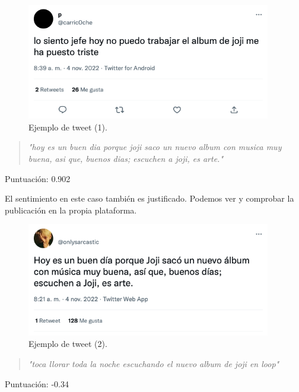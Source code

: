 \begin{figure}[H]
    \centering
    \myfloatalign
    \includegraphics[width=0.95\textwidth]{gfx/twit1.png}
    \caption[Ejemplo de tweet (1)]{Ejemplo de tweet (1).}\label{gfx:twit1}
\end{figure}

\vspace{0.3cm}

\begin{quotation}
		\textit{"hoy es un buen dia porque joji saco un nuevo album con musica muy buena, asi que, buenos dias; escuchen a joji, es arte."}
\end{quotation}
Puntuación: 0.902

\vspace{0.4cm}

El sentimiento en este caso también es justificado. Podemos ver y comprobar la publicación en la propia plataforma.

\begin{figure}[H]
    \centering
    \myfloatalign
    \includegraphics[width=0.95\textwidth]{gfx/twit2.png}
    \caption[Ejemplo de tweet (2)]{Ejemplo de tweet (2).}\label{gfx:twit2}
\end{figure}

\vspace{0.3cm}

\begin{quotation}
		\textit{"toca llorar toda la noche escuchando el nuevo album de joji en loop"}
\end{quotation}
Puntuación: -0.34

